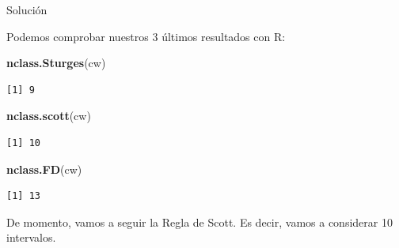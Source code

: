 \documentclass[
  ignorenonframetext,
]{beamer}
\newenvironment{Shaded}{\begin{snugshade}}{\end{snugshade}}
\newcommand{\KeywordTok}[1]{\textcolor[rgb]{0.13,0.29,0.53}{\textbf{#1}}}
\newcommand{\NormalTok}[1]{#1}
\begin{document}
\begin{frame}[fragile]{Solución}
\protect\hypertarget{soluciuxf3n-3}{}

Podemos comprobar nuestros 3 últimos resultados con R:

\begin{Shaded}
\begin{Highlighting}[]
\KeywordTok{nclass.Sturges}\NormalTok{(cw)}
\end{Highlighting}
\end{Shaded}

\begin{verbatim}
[1] 9
\end{verbatim}

\begin{Shaded}
\begin{Highlighting}[]
\KeywordTok{nclass.scott}\NormalTok{(cw)}
\end{Highlighting}
\end{Shaded}

\begin{verbatim}
[1] 10
\end{verbatim}

\begin{Shaded}
\begin{Highlighting}[]
\KeywordTok{nclass.FD}\NormalTok{(cw)}
\end{Highlighting}
\end{Shaded}

\begin{verbatim}
[1] 13
\end{verbatim}

De momento, vamos a seguir la Regla de Scott. Es decir, vamos a
considerar 10 intervalos.

\end{frame}
\end{document}

